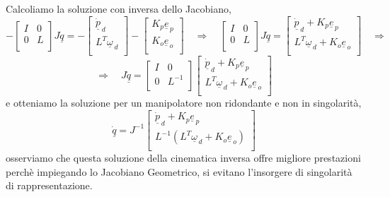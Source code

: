 Calcoliamo la soluzione con inversa dello Jacobiano,
\begin{equation*}
	-
	\begin{bmatrix}
		I & 0 \\
		0 & L \\
	\end{bmatrix}
	J \underline{\dot{q}} =
	- 
	\begin{bmatrix}
		\underline{\dot{p}}_{\,d} \\
		L^T \underline{\omega}_{\,d} \\
	\end{bmatrix}	
	-
	\begin{bmatrix}
		K_p \underline{e}_{\,p} \\
		K_o \underline{e}_{\,o} \\
	\end{bmatrix}
	\quad \Rightarrow \quad
	\begin{bmatrix}
		I & 0 \\
		0 & L \\
	\end{bmatrix}
	J \underline{\dot{q}} =
	\begin{bmatrix}
		\underline{\dot{p}}_{\,d} + K_p \underline{e}_{\,p} \\
		L^T \underline{\omega}_{\,d} + K_o \underline{e}_{\,o} \\
	\end{bmatrix}
	\quad \Rightarrow
\end{equation*}
\begin{equation*}
	\Rightarrow \quad 
	J \underline{\dot{q}} = 
	\begin{bmatrix}
		I & 0 \\
		0 & L^{-1} \\
	\end{bmatrix}
	\begin{bmatrix}
		\underline{\dot{p}}_{\,d} + K_p \underline{e}_{\,p} \\
		L^T \underline{\omega}_{\,d} + K_o \underline{e}_{\,o} \\
	\end{bmatrix}
\end{equation*}
e otteniamo la soluzione per un manipolatore non ridondante e non in singolarità,
\begin{equation}
	\underline{\dot{q}} = J^{-1}
	\begin{bmatrix}
		\underline{\dot{p}}_{\,d} + K_p \underline{e}_{\,p} \\
		L^{-1}(L^T \underline{\omega}_{\,d} + K_o \underline{e}_{\,o}) \\
	\end{bmatrix}
\end{equation}
osserviamo che questa soluzione della cinematica inversa offre migliore prestazioni perchè impiegando lo Jacobiano Geometrico, si evitano l'insorgere di singolarità di rappresentazione.

